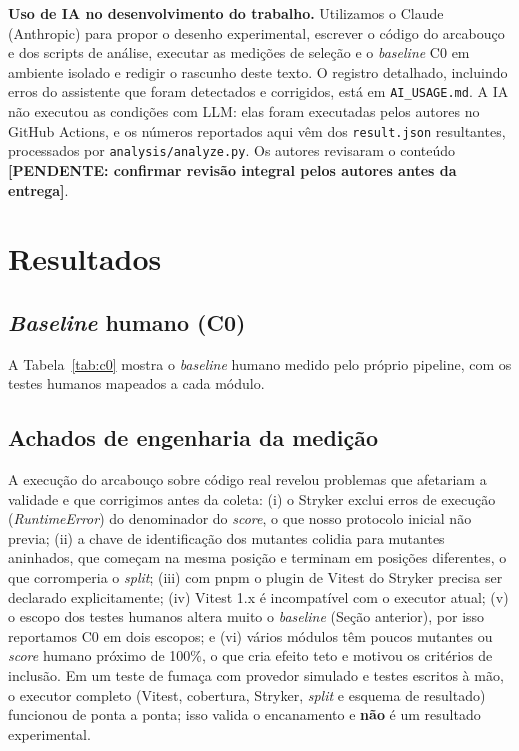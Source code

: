 \documentclass[12pt]{article}
\newcommand{\pendente}[1]{{\color{red}\textbf{[PENDENTE: #1]}}}
\begin{document}
\textbf{Uso de IA no desenvolvimento do trabalho.} Utilizamos o Claude (Anthropic) para propor o desenho experimental,
escrever o código do arcabouço e dos scripts de análise, executar as medições de seleção e o \textit{baseline} C0 em ambiente
isolado e redigir o rascunho deste texto. O registro detalhado, incluindo erros do assistente que foram detectados e
corrigidos, está em \texttt{AI\_USAGE.md}. A IA não executou as condições com LLM: elas foram executadas pelos autores no
GitHub Actions, e os números reportados aqui vêm dos \texttt{result.json} resultantes, processados por
\texttt{analysis/analyze.py}. Os autores revisaram o
conteúdo \pendente{confirmar revisão integral pelos autores antes da entrega}.

\section{Resultados}
\label{sec:resultados}

\subsection{\textit{Baseline} humano (C0)}

A Tabela~\ref{tab:c0} mostra o \textit{baseline} humano medido pelo próprio pipeline, com os testes humanos mapeados a cada
módulo. 

\begin{table}[t]
\centering\small

\caption{C0 (escopo módulo): suíte humana do módulo. MS\textsubscript{eval} e MS\textsubscript{all} no grupo de avaliação e no total.}
\label{tab:c0}
\end{table}

\subsection{Achados de engenharia da medição}

A execução do arcabouço sobre código real revelou problemas que afetariam a validade e que corrigimos antes da coleta:
(i) o Stryker exclui erros de execução (\textit{RuntimeError}) do denominador do \textit{score}, o que nosso protocolo
inicial não previa; (ii) a chave de identificação dos mutantes colidia para mutantes aninhados, que começam na mesma
posição e terminam em posições diferentes, o que corromperia o \textit{split}; (iii) com pnpm o plugin de Vitest do
Stryker precisa ser declarado explicitamente; (iv) Vitest 1.x é incompatível com o executor atual; (v) o escopo dos
testes humanos altera muito o \textit{baseline} (Seção anterior), por isso reportamos C0 em dois escopos; e (vi) vários
módulos têm poucos mutantes ou \textit{score} humano próximo de 100\%, o que cria efeito teto e motivou os critérios de
inclusão. Em um teste de fumaça com provedor simulado e testes escritos à mão, o executor completo (Vitest, cobertura,
Stryker, \textit{split} e esquema de resultado) funcionou de ponta a ponta; isso valida o encanamento e \textbf{não} é um
resultado experimental.
\end{document}
